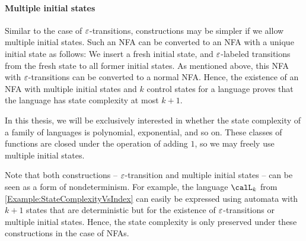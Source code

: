 \documentclass[../../diss.tex]{subfiles}
\begin{document}
\paragraph{Multiple initial states}

Similar to the case of $\varepsilon$-transitions, constructions may be simpler if we allow multiple initial states.
Such an NFA can be converted to an NFA with a unique initial state as follows: We insert a fresh initial state, and $\varepsilon$-labeled transitions from the fresh state to all former initial states.
As mentioned above, this NFA with $\varepsilon$-transitions can be converted to a normal NFA.\@
Hence, the existence of an NFA with multiple initial states and $k$ control states for a language proves that the language has state complexity at most $k+1$.

In this thesis, we will be exclusively interested in whether the state complexity of a family of languages is polynomial, exponential, and so on.
These classes of functions are closed under the operation of adding $1$, so we may freely use multiple initial states.

Note that both constructions -- $\varepsilon$-transition and multiple initial states -- can be seen as a form of nondeterminism.
For example, the language $\calL_k$ from \cref{Example:StateComplexityVsIndex} can easily be expressed using automata with $k+1$ states that are deterministic but for the existence of $\varepsilon$-transitions or multiple initial states.
Hence, the state complexity is only preserved under these constructions in the case of NFAs.
\end{document}
